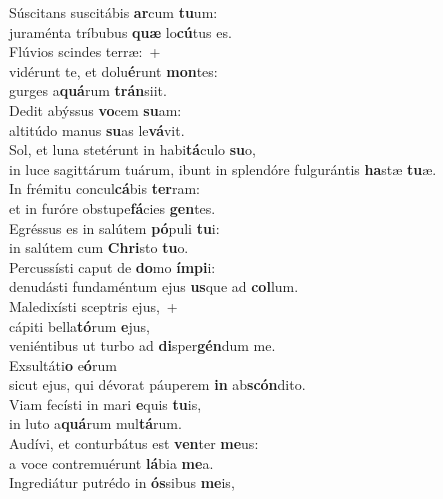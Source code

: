 \evenverse Súscitans suscitábis \textbf{ar}cum \textbf{tu}um:~\*\\
\evenverse juraménta tríbubus \textbf{quæ} lo\textbf{cú}tus es.\\
\oddverse Flúvios scindes terræ:~+\\
\oddverse  vidérunt te, et dolu\textbf{é}runt \textbf{mon}tes:~\*\\
\oddverse gurges a\textbf{quá}rum \textbf{trán}siit.\\
\evenverse Dedit abýssus \textbf{vo}cem \textbf{su}am:~\*\\
\evenverse altitúdo manus \textbf{su}as le\textbf{vá}vit.\\
\oddverse Sol, et luna stetérunt in habi\textbf{tá}culo \textbf{su}o,~\*\\
\oddverse in luce sagittárum tuárum, ibunt in splendóre fulgurántis \textbf{ha}stæ \textbf{tu}æ.\\
\evenverse In frémitu concul\textbf{cá}bis \textbf{ter}ram:~\*\\
\evenverse et in furóre obstupe\textbf{fá}cies \textbf{gen}tes.\\
\oddverse Egréssus es in salútem \textbf{pó}puli \textbf{tu}i:~\*\\
\oddverse in salútem cum \textbf{Chri}sto \textbf{tu}o.\\
\evenverse Percussísti caput de \textbf{do}mo \textbf{ím}\textbf{pi}i:~\*\\
\evenverse denudásti fundaméntum ejus \textbf{us}que ad \textbf{col}lum.\\
\oddverse Maledixísti sceptris ejus,~+\\
\oddverse  cápiti bella\textbf{tó}rum \textbf{e}jus,~\*\\
\oddverse veniéntibus ut turbo ad \textbf{di}sper\textbf{gén}dum me.\\
\evenverse Exsultáti\textbf{o} e\textbf{ó}rum~\*\\
\evenverse sicut ejus, qui dévorat páuperem \textbf{in} ab\textbf{scón}dito.\\
\oddverse Viam fecísti in mari \textbf{e}quis \textbf{tu}is,~\*\\
\oddverse in luto a\textbf{quá}rum mul\textbf{tá}rum.\\
\evenverse Audívi, et conturbátus est \textbf{ven}ter \textbf{me}us:~\*\\
\evenverse a voce contremuérunt \textbf{lá}bia \textbf{me}a.\\
\oddverse Ingrediátur putrédo in \textbf{ós}sibus \textbf{me}is,~\*\\
